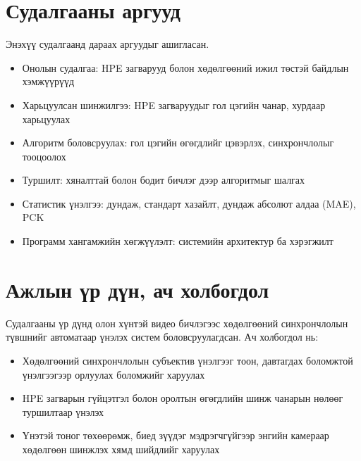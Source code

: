 \section{Судалгааны аргууд}

Энэхүү судалгаанд дараах аргуудыг ашигласан.

\begin{itemize}
\item
  Онолын судалгаа: HPE загварууд болон хөдөлгөөний ижил төстэй байдлын хэмжүүрүүд
\item
  Харьцуулсан шинжилгээ: HPE загваруудыг гол цэгийн чанар, хурдаар харьцуулах
\item
  Алгоритм боловсруулах: гол цэгийн өгөгдлийг цэвэрлэх, синхрончлолыг тооцоолох
\item
  Туршилт: хяналттай болон бодит бичлэг дээр алгоритмыг шалгах
\item
  Статистик үнэлгээ: дундаж, стандарт хазайлт, дундаж абсолют алдаа (MAE), PCK
\item
  Программ хангамжийн хөгжүүлэлт: системийн архитектур ба хэрэгжилт
\end{itemize}

\section{Ажлын үр дүн, ач холбогдол}

Судалгааны үр дүнд олон хүнтэй видео бичлэгээс хөдөлгөөний синхрончлолын түвшнийг автоматаар үнэлэх систем боловсруулагдсан. Ач холбогдол нь:

\begin{itemize}
\item
  Хөдөлгөөний синхрончлолын субъектив үнэлгээг тоон, давтагдах боломжтой үнэлгээгээр орлуулах боломжийг харуулах
\item
  HPE загварын гүйцэтгэл болон оролтын өгөгдлийн шинж чанарын нөлөөг туршилтаар үнэлэх
\item
  Үнэтэй тоног төхөөрөмж, биед зүүдэг мэдрэгчгүйгээр энгийн камераар хөдөлгөөн шинжлэх хямд шийдлийг харуулах
\end{itemize}

